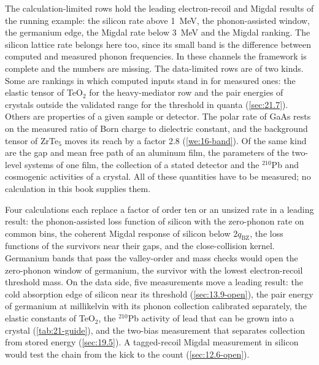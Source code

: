 The calculation-limited rows hold the leading electron-recoil and Migdal results of the running example: the silicon rate above \SI{1}{MeV}, the phonon-assisted window, the germanium edge, the Migdal rate below \SI{3}{MeV} and the Migdal ranking. The silicon lattice rate belongs here too, since its small band is the difference between computed and measured phonon frequencies. In these channels the framework is complete and the numbers are missing. The data-limited rows are of two kinds. Some are rankings in which computed inputs stand in for measured ones: the elastic tensor of TeO$_2$ for the heavy-mediator row and the pair energies of crystals outside the validated range for the threshold in quanta (\cref{sec:21.7}). Others are properties of a given sample or detector. The polar rate of GaAs rests on the measured ratio of Born charge to dielectric constant, and the background tensor of ZrTe$_5$ moves its reach by a factor 2.8 (\cref{we:16-band}). Of the same kind are the gap and mean free path of an aluminum film, the parameters of the two-level systems of one film, the collection of a stated detector and the $^{210}$Pb and cosmogenic activities of a crystal. All of these quantities have to be measured; no calculation in this book supplies them.

Four calculations each replace a factor of order ten or an unsized rate in a leading result: the phonon-assisted loss function of silicon with the zero-phonon rate on common bins, the coherent Migdal response of silicon below $2q_{\mathrm{BZ}}$, the loss functions of the survivors near their gaps, and the close-collision kernel. Germanium bands that pass the valley-order and mass checks would open the zero-phonon window of germanium, the survivor with the lowest electron-recoil threshold mass. On the data side, five measurements move a leading result: the cold absorption edge of silicon near its threshold (\cref{sec:13.9-open}), the pair energy of germanium at millikelvin with its phonon collection calibrated separately, the elastic constants of TeO$_2$, the $^{210}$Pb activity of lead that can be grown into a crystal (\cref{tab:21-guide}), and the two-bias measurement that separates collection from stored energy (\cref{sec:19.5}). A tagged-recoil Migdal measurement in silicon would test the chain from the kick to the count (\cref{sec:12.6-open}).
